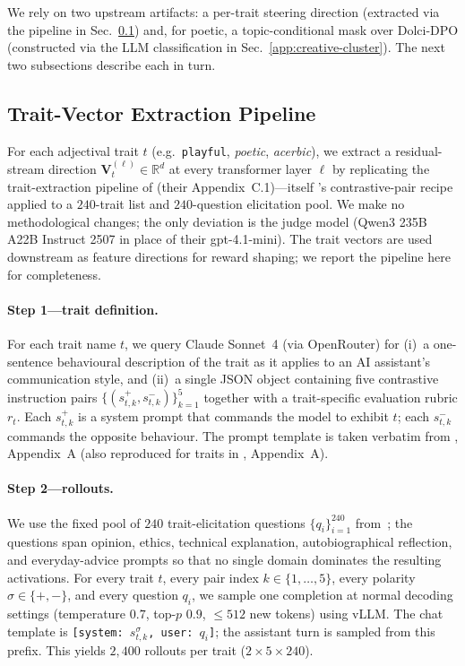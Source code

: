 \documentclass{article} %
\begin{document}
We rely on two upstream artifacts: a per-trait steering direction
(extracted via the pipeline in Sec.~\ref{app:trait-extraction}) and, for
poetic, a topic-conditional mask over Dolci-DPO (constructed via the LLM
classification in Sec.~\ref{app:creative-cluster}). The next two
subsections describe each in turn.


\subsection{Trait-Vector Extraction Pipeline}
\label{app:trait-extraction}

For each adjectival trait $t$ (e.g.\ \texttt{playful}, \emph{poetic},
\emph{acerbic}), we extract a residual-stream direction
$\mathbf{V}_t^{(\ell)} \in \mathbb{R}^{d}$ at every transformer layer
$\ell$ by replicating the trait-extraction pipeline of
\citet{lu2026assistant} (their Appendix~C.1)---itself
\citet{chen2025persona}'s contrastive-pair recipe applied to a
$240$-trait list and $240$-question elicitation pool. We make no
methodological changes; the only deviation is the judge model
(Qwen3 235B A22B Instruct 2507 in place of their gpt-4.1-mini). The trait vectors
are used downstream as feature directions for reward shaping; we
report the pipeline here for completeness.

\paragraph{Step 1---trait definition.}
For each trait name $t$, we query Claude Sonnet~4 (via OpenRouter) for
(i)~a one-sentence behavioural description of the trait as it applies to
an AI assistant's communication style, and (ii)~a single JSON object
containing five contrastive instruction pairs
$\{(s^{+}_{t,k}, s^{-}_{t,k})\}_{k=1}^{5}$ together with a trait-specific
evaluation rubric $r_t$. Each $s^{+}_{t,k}$ is a system prompt that
commands the model to exhibit $t$; each $s^{-}_{t,k}$ commands the
opposite behaviour. The prompt template is taken verbatim from
\citet{chen2025persona}, Appendix~A (also reproduced for traits in
\citet{lu2026assistant}, Appendix~A).

\paragraph{Step 2---rollouts.}
We use the fixed pool of $240$ trait-elicitation questions
$\{q_i\}_{i=1}^{240}$ from~\citet{lu2026assistant}; the questions span
opinion, ethics, technical explanation, autobiographical reflection,
and everyday-advice prompts so that no single domain dominates the
resulting activations. For every trait $t$, every pair index
$k \in \{1,\dots,5\}$, every polarity $\sigma \in \{+, -\}$, and every
question $q_i$, we sample one completion at normal decoding settings
(temperature $0.7$, top-$p$ $0.9$, $\le 512$ new tokens) using vLLM.
The chat template is
\texttt{[system: $s^{\sigma}_{t,k}$, user: $q_i$]}; the assistant turn
is sampled from this prefix. This yields $2{,}400$ rollouts per trait
($2 \times 5 \times 240$).
\end{document}

